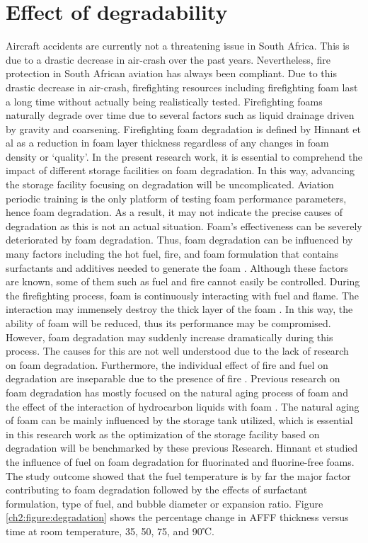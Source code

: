 \documentclass[12pt]{report}
\begin{document}
\section{Effect of degradability}
Aircraft accidents are currently not a threatening issue in South Africa. This is due to a drastic decrease in air-crash over the past years. Nevertheless, fire protection in South African aviation has always been compliant. Due to this drastic decrease in air-crash, firefighting resources including firefighting foam last a long time without actually being realistically tested. Firefighting foams naturally degrade over time due to several factors such as liquid drainage driven by gravity and coarsening. Firefighting foam degradation is defined by Hinnant et al \cite{hinnant2017influence} as a reduction in foam layer thickness regardless of any changes in foam density or ‘quality’.
In the present research work, it is essential to comprehend the impact of different storage facilities on foam degradation. In this way, advancing the storage facility focusing on degradation will be uncomplicated. Aviation periodic training is the only platform of testing foam performance parameters, hence foam degradation. As a result, it may not indicate the precise causes of degradation as this is not an actual situation. Foam’s effectiveness can be severely deteriorated by foam degradation. Thus, foam degradation can be influenced by many factors including the hot fuel, fire, and foam formulation that contains surfactants and additives needed to generate the foam \cite{hinnant2017influence}. Although these factors are known, some of them such as fuel and fire cannot easily be controlled.    
During the firefighting process, foam is continuously interacting with fuel and flame. The interaction may immensely destroy the thick layer of the foam \cite{osei2015foam}. In this way, the ability of foam will be reduced, thus its performance may be compromised. However, foam degradation may suddenly increase dramatically during this process.  The causes for this are not well understood due to the lack of research on foam degradation. Furthermore, the individual effect of fire and fuel on degradation are inseparable due to the presence of fire \cite{hinnant2017influence}. 
Previous research on foam degradation has mostly focused on the natural aging process of foam \cite{do2011numerical} and the effect of the interaction of hydrocarbon liquids with foam \cite{osei2015foam}.  The natural aging of foam can be mainly influenced by the storage tank utilized, which is essential in this research work as the optimization of the storage facility based on degradation will be benchmarked by these previous Research. Hinnant et \cite{hinnant2017influence} studied the influence of fuel on foam degradation for fluorinated and fluorine-free foams. The study outcome showed that the fuel temperature is by far the major factor contributing to foam degradation followed by the effects of surfactant formulation, type of fuel, and bubble diameter or expansion ratio. Figure \ref{ch2:figure:degradation} shows the percentage change in AFFF thickness versus time at room temperature, 35, 50, 75, and 90℃.
\end{document}
